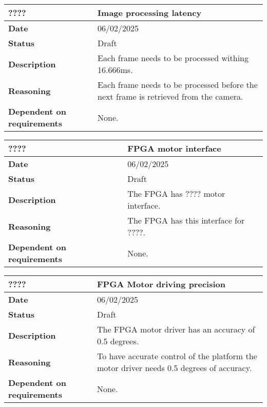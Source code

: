 \documentclass{article}
\begin{document}
\begin{table}[H]
    \renewcommand{\arraystretch}{1.3}
    \begin{tabular}{|l|p{10cm}|}
        \hline
        \rowcolor{gray!50}
        \textbf{????} & \textbf{Image processing latency} \\ \hline
        \textbf{Date} & 06/02/2025 \\ \hline
        \textbf{Status} & Draft \\ \hline
        \textbf{Description} & Each frame needs to be processed withing 16.666ms. \\ \hline
        \textbf{Reasoning} & Each frame needs to be processed before the next frame is retrieved from the camera. \\ \hline
        \textbf{Dependent on requirements} & None. \\ \hline
    \end{tabular}
\end{table}

\begin{table}[H]
    \renewcommand{\arraystretch}{1.3}
    \begin{tabular}{|l|p{10cm}|}
        \hline
        \rowcolor{gray!50}
        \textbf{????} & \textbf{FPGA motor interface} \\ \hline
        \textbf{Date} & 06/02/2025 \\ \hline
        \textbf{Status} & Draft \\ \hline
        \textbf{Description} & The FPGA has ???? motor interface. \\ \hline
        \textbf{Reasoning} & The FPGA has this interface for ????. \\ \hline
        \textbf{Dependent on requirements} & None. \\ \hline
    \end{tabular}
\end{table}

\begin{table}[H]
    \renewcommand{\arraystretch}{1.3}
    \begin{tabular}{|l|p{10cm}|}
        \hline
        \rowcolor{gray!50}
        \textbf{????} & \textbf{FPGA Motor driving precision} \\ \hline
        \textbf{Date} & 06/02/2025 \\ \hline
        \textbf{Status} & Draft \\ \hline
        \textbf{Description} & The FPGA motor driver has an accuracy of 0.5 degrees. \\ \hline
        \textbf{Reasoning} & To have accurate control of the platform the motor driver needs 0.5 degrees of accuracy. \\ \hline
        \textbf{Dependent on requirements} & None. \\ \hline
    \end{tabular}
\end{table}
\end{document}
